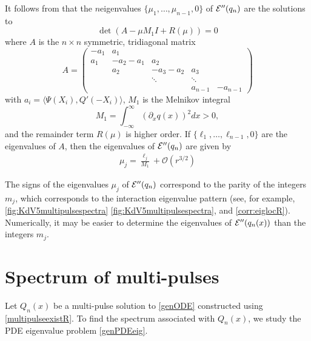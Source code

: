 \documentclass[thesis.tex]{subfiles}
\begin{document}
\begin{remark}\label{remark:Hessianeigs}
It follows from \cite{Sandstede1998} that the $n$eigenvalues $\{ \mu_1, \dots, \mu_{n-1}, 0 \}$ of $\mathcal{E}''(q_n)$ are the solutions to 
\[
\det(A - \mu M_1 I + R(\mu)) = 0
\]
where $A$ is the $n \times n$ symmetric, tridiagonal matrix
\begin{equation}\label{nhomA}
A = \begin{pmatrix}
-a_1 & a_1 \\
a_1 & -a_2 - a_1 & a_2 \\
& a_2 & -a_3 - a_2 & a_3 \\
&& \ddots & \ddots \\
& & & a_{n-1} & -a_{n-1} 
\end{pmatrix}
\end{equation}
with $a_i = \langle \Psi(X_i), Q'(-X_i) \rangle$, $M_1$ is the Melnikov integral
\begin{equation}
M_1 = \int_{-\infty}^\infty \left( \partial_x q(x) \right)^2 dx > 0,
\end{equation}\label{nhomM1}
and the remainder term $R(\mu)$ is higher order. If $\{\ell_1, \dots, \ell_{n-1}, 0\}$ are the eigenvalues of $A$, then the eigenvalues of $\mathcal{E}''(q_n)$ are given by
\begin{align*}
\mu_j = \frac{\ell_j}{M_1} + \mathcal{O}(r^{3/2})
\end{align*}
\end{remark}

\begin{remark}
The signs of the eigenvalues $\mu_j$ of $\mathcal{E}''(q_n)$ correspond to the parity of the integers $m_j$, which corresponds to the interaction eigenvalue pattern (see, for example, \cref{fig:KdV5multipulsespectra} \cref{fig:KdV5multipulsespectra}, and \cref{corr:eiglocR}). Numerically, it may be easier to determine the eigenvalues of $\mathcal{E}''(q_n(x))$ than the integers $m_j$.
\end{remark}

\section{Spectrum of multi-pulses}\label{sec:multispecR}

Let $Q_n(x)$ be a multi-pulse solution to \cref{genODE} constructed using \cref{multipulseexistR}. To find the spectrum associated with $Q_n(x)$, we study the PDE eigenvalue problem \cref{genPDEeig}. 
\end{document}
